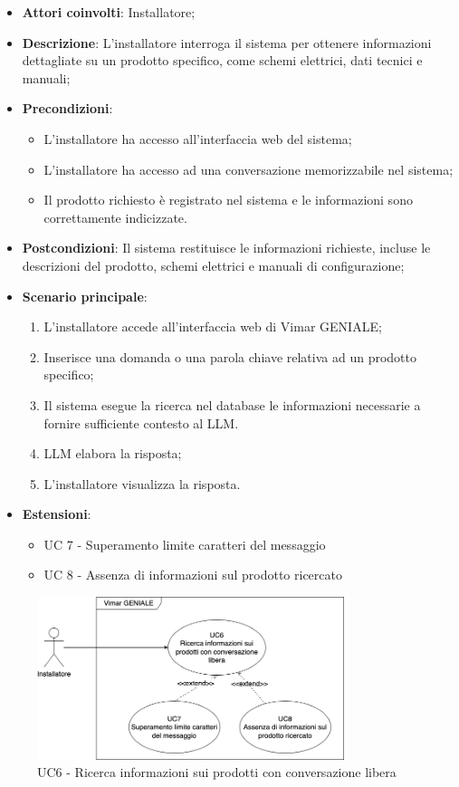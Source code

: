 \begin{itemize}
    \item \textbf{Attori coinvolti}: Installatore;
    \item \textbf{Descrizione}: L’installatore interroga il sistema per ottenere informazioni dettagliate su un prodotto specifico, come schemi elettrici, dati tecnici e manuali;
    \item \textbf{Precondizioni}: 
        \begin{itemize}
            \item L’installatore ha accesso all’interfaccia web del sistema;
            \item L’installatore ha accesso ad una conversazione memorizzabile nel sistema;
            \item Il prodotto richiesto è registrato nel sistema e le informazioni sono correttamente indicizzate.
        \end{itemize}
    \item \textbf{Postcondizioni}: Il sistema restituisce le informazioni richieste, incluse le descrizioni del prodotto, schemi elettrici e manuali di configurazione;
    \item \textbf{Scenario principale}:
    \begin{enumerate}
    \item L’installatore accede all’interfaccia web di Vimar GENIALE;
    \item Inserisce una domanda o una parola chiave relativa ad un prodotto specifico;
    \item Il sistema esegue la ricerca nel database le informazioni necessarie a fornire sufficiente contesto al LLM.
    \item LLM elabora la risposta;
    \item L’installatore visualizza la risposta.
    \end{enumerate}
    \item \textbf{Estensioni}: 
        \begin{itemize}
            \item UC 7 - Superamento limite caratteri del messaggio
            \item UC 8 - Assenza di informazioni sul prodotto ricercato
        \end{itemize}
\end{itemize}
\begin{figure}[H]
\centering
\includegraphics[width=0.8\textwidth]{contents/casi_duso/png/UC6.png}
\caption{UC6 - Ricerca informazioni sui prodotti con conversazione libera}
\end{figure}



